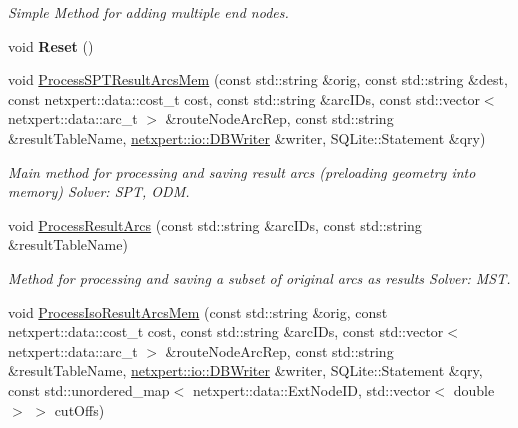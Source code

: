 \begin{DoxyCompactItemize}
\begin{DoxyCompactList}\small\item\em Simple Method for adding multiple end nodes. \end{DoxyCompactList}\item 
void {\bfseries Reset} ()\hypertarget{classnetxpert_1_1InternalNet_aa2dccfb48a31d718181d96518c3532e2}{}\label{classnetxpert_1_1InternalNet_aa2dccfb48a31d718181d96518c3532e2}

\item 
void \hyperlink{classnetxpert_1_1InternalNet_a4b62c28e5ec1b756cde5851f62be8498}{Process\+S\+P\+T\+Result\+Arcs\+Mem} (const std\+::string \&orig, const std\+::string \&dest, const netxpert\+::data\+::cost\+\_\+t cost, const std\+::string \&arc\+I\+Ds, const std\+::vector$<$ netxpert\+::data\+::arc\+\_\+t $>$ \&route\+Node\+Arc\+Rep, const std\+::string \&result\+Table\+Name, \hyperlink{classnetxpert_1_1io_1_1DBWriter}{netxpert\+::io\+::\+D\+B\+Writer} \&writer, S\+Q\+Lite\+::\+Statement \&qry)\hypertarget{classnetxpert_1_1InternalNet_a4b62c28e5ec1b756cde5851f62be8498}{}\label{classnetxpert_1_1InternalNet_a4b62c28e5ec1b756cde5851f62be8498}

\begin{DoxyCompactList}\small\item\em Main method for processing and saving result arcs (preloading geometry into memory) Solver\+: S\+PT, O\+DM. \end{DoxyCompactList}\item 
void \hyperlink{classnetxpert_1_1InternalNet_aaad9b38faf38aeb62d266499d2204ea0}{Process\+Result\+Arcs} (const std\+::string \&arc\+I\+Ds, const std\+::string \&result\+Table\+Name)\hypertarget{classnetxpert_1_1InternalNet_aaad9b38faf38aeb62d266499d2204ea0}{}\label{classnetxpert_1_1InternalNet_aaad9b38faf38aeb62d266499d2204ea0}

\begin{DoxyCompactList}\small\item\em Method for processing and saving a subset of original arcs as results Solver\+: M\+ST. \end{DoxyCompactList}\item 
void \hyperlink{classnetxpert_1_1InternalNet_ae39fff10981cd5f5da5541a44f515fe1}{Process\+Iso\+Result\+Arcs\+Mem} (const std\+::string \&orig, const netxpert\+::data\+::cost\+\_\+t cost, const std\+::string \&arc\+I\+Ds, const std\+::vector$<$ netxpert\+::data\+::arc\+\_\+t $>$ \&route\+Node\+Arc\+Rep, const std\+::string \&result\+Table\+Name, \hyperlink{classnetxpert_1_1io_1_1DBWriter}{netxpert\+::io\+::\+D\+B\+Writer} \&writer, S\+Q\+Lite\+::\+Statement \&qry, const std\+::unordered\+\_\+map$<$ netxpert\+::data\+::\+Ext\+Node\+ID, std\+::vector$<$ double $>$ $>$ cut\+Offs)\hypertarget{classnetxpert_1_1InternalNet_ae39fff10981cd5f5da5541a44f515fe1}{}\label{classnetxpert_1_1InternalNet_ae39fff10981cd5f5da5541a44f515fe1}


\end{DoxyCompactItemize}
